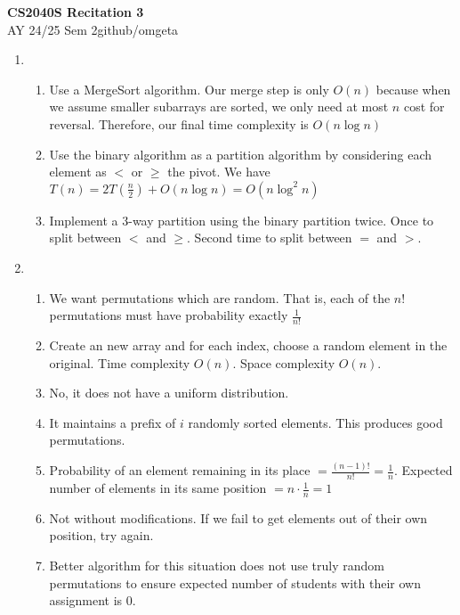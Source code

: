 \documentclass[12pt, a4paper]{article}
\newcommand{\mytitle}{CS2040S Recitation 3}
\newcommand{\myauthor}{github/omgeta}
\newcommand{\mydate}{AY 24/25 Sem 2}
\begin{document}
\raggedright
\footnotesize
\begin{center}
{\normalsize{\textbf{\mytitle}}} \\
{\footnotesize{\mydate\hspace{2pt}\textemdash\hspace{2pt}\myauthor}}
\end{center}
\begin{enumerate}[Q\arabic*.]
  \item 
    \begin{enumerate}[(\alph*.)]
      \item Use a MergeSort algorithm. Our merge step is only $O(n)$ because when we assume smaller subarrays are sorted, we only need at most $n$ cost for reversal. Therefore, our final time complexity is $O(n\log n)$

      \item Use the binary algorithm as a partition algorithm by considering each element as $<$ or $\geq$ the pivot. We have $T(n) = 2T(\frac{n}{2}) + O(n\log n) = O(n\log^2 n)$

      \item Implement a 3-way partition using the binary partition twice. Once to split between $<$ and $\geq$. Second time to split between $=$ and $>$. 
    \end{enumerate}

  \item 
    \begin{enumerate}[(\alph*.)]
      \item We want permutations which are random. That is, each of the $n!$ permutations must have probability exactly $\frac{1}{n!}$

      \item Create an new array and for each index, choose a random element in the original. Time complexity $O(n)$. Space complexity $O(n)$. 

      \item No, it does not have a uniform distribution.

      \item It maintains a prefix of $i$ randomly sorted elements. This produces good permutations.

      \item Probability of an element remaining in its place $= \frac{(n-1)!}{n!} = \frac{1}{n}$. Expected number of elements in its same position $= n \cdot \frac{1}{n} = 1$

      \item Not without modifications. If we fail to get elements out of their own position, try again.

      \item Better algorithm for this situation does not use truly random permutations to ensure expected number of students with their own assignment is $0$.
    \end{enumerate}
\end{enumerate}
\end{document}
